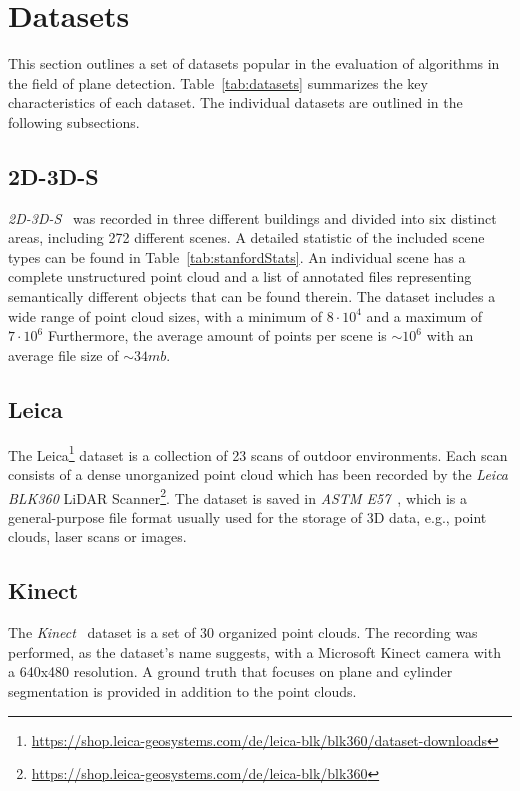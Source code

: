 \documentclass[main.tex]{subfiles}
\begin{document}
\section{Datasets}
This section outlines a set of datasets popular in the evaluation of algorithms
in the field of plane detection. Table~\ref{tab:datasets} summarizes the key characteristics of each
dataset. The individual datasets are outlined in the following subsections.

\subsection{2D-3D-S}
\label{subsec:bg-stanford}
\textit{2D-3D-S}~\cite{2017arXiv170201105A} was recorded in three different buildings and divided into six distinct areas, including 272 different scenes. A detailed statistic of the included scene types can be found in Table~\ref{tab:stanfordStats}.
An individual scene has a complete unstructured point cloud and a list of annotated files representing semantically different objects that can be found therein.
The dataset includes a wide range of point cloud sizes, with a minimum of $8\cdot 10^4$ and a maximum of $7\cdot 10^6$
Furthermore, the average amount of points per scene is ${\sim}10^6$ with an average file size of ${\sim}34mb$.

\subsection{Leica}
\label{subsec:bg-Leica}
The Leica\footnote{\href{https://shop.leica-geosystems.com/de/leica-blk/blk360/dataset-downloads}{https://shop.leica-geosystems.com/de/leica-blk/blk360/dataset-downloads}}
dataset is a collection of 23 scans of outdoor environments.
Each scan consists of a dense unorganized point cloud which has been recorded by the \textit{Leica BLK360}
LiDAR Scanner\footnote{\href{https://shop.leica-geosystems.com/de/leica-blk/blk360}{https://shop.leica-geosystems.com/de/leica-blk/blk360}}.
The dataset is saved in \textit{ASTM E57}~\cite{Huber-2011-7211}, which is a general-purpose file format usually used for the
storage of 3D data, e.g., point clouds, laser scans or images.

\subsection{Kinect}
\label{subsec:bg-Kinect}
The \textit{Kinect}~\cite{Oehler_Stueckler_Welle_Schulz_Behnke_2011} dataset is a set of 30 organized point clouds. The recording was performed, as the
dataset's name suggests, with a Microsoft Kinect camera with a 640x480 resolution.
A ground truth that focuses on plane and cylinder segmentation is provided in addition to the point clouds.
\end{document}
